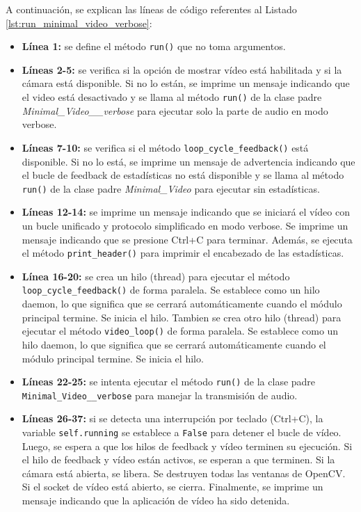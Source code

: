 A continuación, se explican las líneas de código referentes al Listado \ref{lst:run_minimal_video_verbose}:
\begin{itemize}
    \item \textbf{Línea 1:} se define el método \texttt{run()} que no toma argumentos.
    \item \textbf{Líneas 2-5:} se verifica si la opción de mostrar vídeo está habilitada y si la cámara está disponible. Si no lo están, se imprime un mensaje indicando que el video está desactivado y se llama al método \texttt{run()} de la clase padre \textit{Minimal\_Video\_\_verbose} para ejecutar solo la parte de audio en modo verbose.
    \item \textbf{Líneas 7-10:} se verifica si el método \texttt{loop\_cycle\_feedback()} está disponible. Si no lo está, se imprime un mensaje de advertencia indicando que el bucle de feedback de estadísticas no está disponible y se llama al método \texttt{run()} de la clase padre \textit{Minimal\_Video} para ejecutar sin estadísticas.
    \item \textbf{Líneas 12-14:} se imprime un mensaje indicando que se iniciará el vídeo con un bucle unificado y protocolo simplificado en modo verbose. Se imprime un mensaje indicando que se presione Ctrl+C para terminar. Además, se ejecuta el método \texttt{print\_header()} para imprimir el encabezado de las estadísticas.
    \item \textbf{Línea 16-20:} se crea un hilo (thread) para ejecutar el método \texttt{loop\_cycle\_feedback()} de forma paralela. Se establece como un hilo daemon, lo que significa que se cerrará automáticamente cuando el módulo principal termine. Se inicia el hilo. Tambien se crea otro hilo (thread) para ejecutar el método \texttt{video\_loop()} de forma paralela. Se establece como un hilo daemon, lo que significa que se cerrará automáticamente cuando el módulo principal termine. Se inicia el hilo.
    \item \textbf{Líneas 22-25:} se intenta ejecutar el método \texttt{run()} de la clase padre \texttt{Minimal\_Video\_\_verbose} para manejar la transmisión de audio.
    \item \textbf{Líneas 26-37:} si se detecta una interrupción por teclado (Ctrl+C), la variable \texttt{self.running} se establece a \texttt{False} para detener el bucle de vídeo. Luego, se espera a que los hilos de feedback y vídeo terminen su ejecución. Si el hilo de feedback y vídeo están activos, se esperan a que terminen. Si la cámara está abierta, se libera. Se destruyen todas las ventanas de OpenCV. Si el socket de vídeo está abierto, se cierra. Finalmente, se imprime un mensaje indicando que la aplicación de vídeo ha sido detenida.
\end{itemize}
\vspace{\baselineskip}

